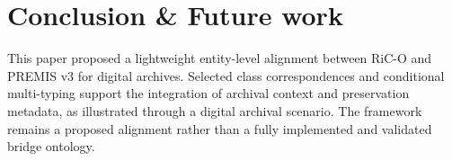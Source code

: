\documentclass[runningheads]{llncs}
\begin{document}
\section{Conclusion \& Future work}
\label{sec:conclusion}
This paper proposed a lightweight entity-level alignment
between RiC-O and PREMIS v3 for digital archives.
Selected class correspondences and conditional multi-typing
support the integration of archival context and preservation
metadata, as illustrated through a digital archival scenario.
The framework remains a proposed alignment rather than
a fully implemented and validated bridge ontology.
\end{document}
